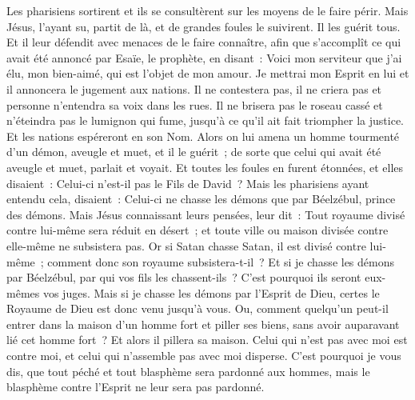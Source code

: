 \begin{multicols}{2}
Les pharisiens sortirent et ils se consultèrent sur les moyens de le faire périr.
Mais Jésus, l'ayant su, partit de là, et de grandes foules le suivirent. Il les guérit tous.
Et il leur défendit avec menaces de le faire connaître,
afin que s'accomplît ce qui avait été annoncé par Esaïe, le prophète, en disant~:
Voici mon serviteur que j'ai élu, mon bien-aimé, qui est l'objet de mon amour. Je mettrai mon Esprit en lui et il annoncera le jugement aux nations.
Il ne contestera pas, il ne criera pas et personne n'entendra sa voix dans les rues.
Il ne brisera pas le roseau cassé et n'éteindra pas le lumignon qui fume, jusqu'à ce qu'il ait fait triompher la justice.
Et les nations espéreront en son Nom.
Alors on lui amena un homme tourmenté d'un démon, aveugle et muet, et il le guérit~; de sorte que celui qui avait été aveugle et muet, parlait et voyait.
Et toutes les foules en furent étonnées, et elles disaient~: Celui-ci n'est-il pas le Fils de David~?
Mais les pharisiens ayant entendu cela, disaient~: Celui-ci ne chasse les démons que par Béelzébul, prince des démons.
Mais Jésus connaissant leurs pensées, leur dit~: Tout royaume divisé contre lui-même sera réduit en désert~; et toute ville ou maison divisée contre elle-même ne subsistera pas.
Or si Satan chasse Satan, il est divisé contre lui-même~; comment donc son royaume subsistera-t-il~?
Et si je chasse les démons par Béelzébul, par qui vos fils les chassent-ils~? C'est pourquoi ils seront eux-mêmes vos juges.
Mais si je chasse les démons par l'Esprit de Dieu, certes le Royaume de Dieu est donc venu jusqu'à vous.
Ou, comment quelqu'un peut-il entrer dans la maison d'un homme fort et piller ses biens, sans avoir auparavant lié cet homme fort~? Et alors il pillera sa maison.
Celui qui n'est pas avec moi est contre moi, et celui qui n'assemble pas avec moi disperse.
C'est pourquoi je vous dis, que tout péché et tout blasphème sera pardonné aux hommes, mais le blasphème contre l'Esprit ne leur sera pas pardonné.

\end{multicols}
